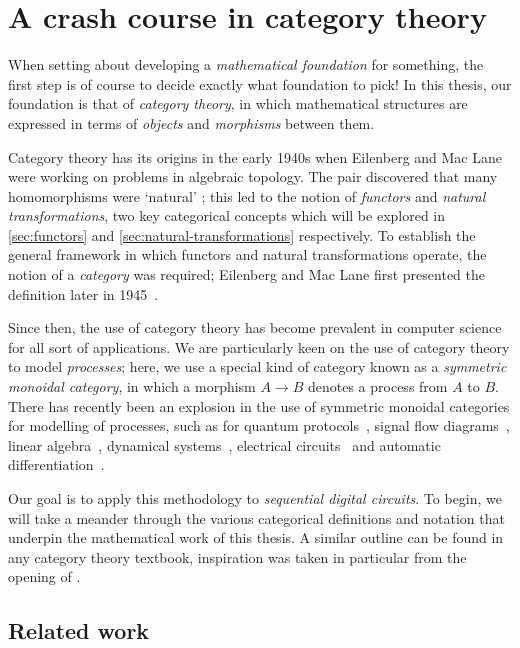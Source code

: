 \chapter{A crash course in category theory}

When setting about developing a \emph{mathematical foundation} for something,
the first step is of course to decide exactly what foundation to pick!
In this thesis, our foundation is that of \emph{category theory}, in which
mathematical structures are expressed in terms of \emph{objects} and
\emph{morphisms} between them.

Category theory has its origins in the early 1940s when Eilenberg and Mac Lane
were working on problems in algebraic topology.
The pair discovered that many homomorphisms were `natural' ;
this led to the notion of \emph{functors} and \emph{natural transformations},
two key categorical concepts which will be explored in
\cref{sec:functors} and \cref{sec:natural-transformations} respectively.
To establish the general framework in which functors and natural transformations
operate, the notion of a \emph{category} was required; Eilenberg and Mac Lane
first presented the definition later in 1945~\cite{eilenberg1945general}.

Since then, the use of category theory has become prevalent in computer science
for all sort of applications.
We are particularly keen on the use of category theory to model
\emph{processes}; here, we use a special kind of category known as a
\emph{symmetric monoidal category}, in which a morphism \(A \to B\) denotes a
process from \(A\) to \(B\).
There has recently been an explosion in the use of symmetric monoidal categories
for modelling of processes, such as for quantum
protocols~\cite{abramsky2004categorical}, signal flow
diagrams~\cite{bonchi2014categorical,bonchi2015full}, linear
algebra~\cite{bonchi2017interacting,zanasi2015interacting,bonchi2019graphical,boisseau2022graphical},
dynamical systems~\cite{baez2015categories,fong2016categorical}, electrical
circuits~\cite{boisseau2022string} and automatic
differentiation~\cite{alvarez-picallo2023functorial}.

Our goal is to apply this methodology to \emph{sequential digital circuits}.
To begin, we will take a meander through the various categorical definitions and
notation that underpin the mathematical work of this thesis.
A similar outline can be found in any category theory textbook, inspiration was
taken in particular from the opening of \cite{ghica2023hierarchical}.













\section{Related work}